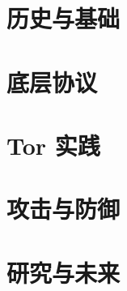 \part{历史与基础}




\part{底层协议}












\part{Tor 实践}









\part{攻击与防御}



\part{研究与未来}



\appendix




